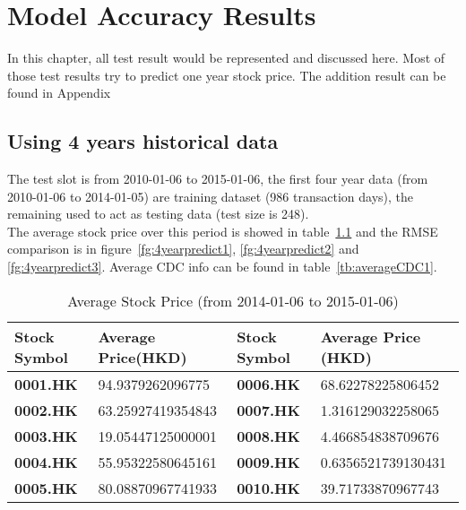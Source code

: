 \chapter{Model Accuracy Results}
\label{ch:AccuracyResult}
In this chapter, all test result would be represented and discussed here. Most of those test results try to predict one year stock price. The addition result can be found in Appendix~


\section{Using 4 years historical data}

The test slot is from 2010-01-06 to 2015-01-06, the first four year data (from 2010-01-06 to 2014-01-05) are training dataset (986 transaction days), the remaining used to act as testing data (test size is 248).\\


The average stock price over this period is showed in table~\ref{tb:avg20142015} and the RMSE comparison is in figure~\ref{fg:4yearpredict1}, \ref{fg:4yearpredict2} and \ref{fg:4yearpredict3}. Average CDC info can be found in table~\ref{tb:averageCDC1}.\\


\begin{table}[h]
	\centering
	\begin{tabular}{|l|l|l|l|}
		\hline
		\textbf{Stock Symbol} & \textbf{Average Price(HKD)} & \textbf{Stock Symbol} & \textbf{Average Price (HKD)} \\ \hline
		\textbf{0001.HK}      & 94.9379262096775       & \textbf{0006.HK}      & 68.62278225806452      \\ \hline
		\textbf{0002.HK}      & 63.25927419354843      & \textbf{0007.HK}      & 1.316129032258065      \\ \hline
		\textbf{0003.HK}      & 19.05447125000001      & \textbf{0008.HK}      & 4.466854838709676      \\ \hline
		\textbf{0004.HK}      & 55.95322580645161      & \textbf{0009.HK}      & 0.6356521739130431     \\ \hline
		\textbf{0005.HK}      & 80.08870967741933      & \textbf{0010.HK}      & 39.71733870967743      \\ \hline
	\end{tabular}
	\caption{Average Stock Price (from 2014-01-06 to 2015-01-06)}
	\label{tb:avg20142015}
\end{table}

